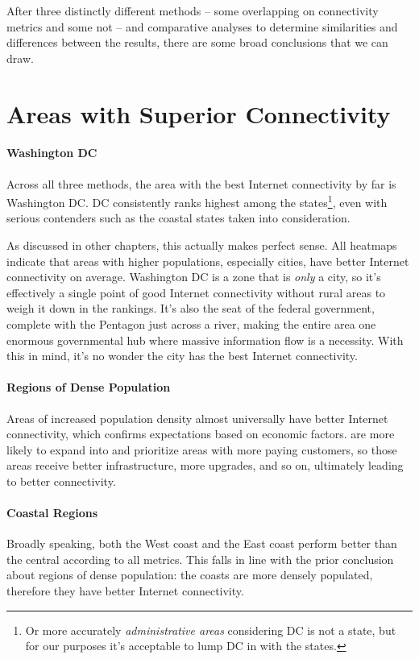 After three distinctly different methods -- some overlapping on connectivity metrics and some not -- and comparative analyses to determine similarities and differences between the results, there are some broad conclusions that we can draw.

\section{Areas with Superior Connectivity}

\paragraph{Washington DC} Across all three methods, the area with the best Internet connectivity by far is Washington DC. DC consistently ranks highest among the states\footnote{Or more accurately \textit{administrative areas} considering DC is not a state, but for our purposes it's acceptable to lump DC in with the states.}, even with serious contenders such as the coastal states taken into consideration.

As discussed in other chapters, this actually makes perfect sense. All heatmaps indicate that areas with higher populations, especially cities, have better Internet connectivity on average. Washington DC is a zone that is \textit{only} a city, so it's effectively a single point of good Internet connectivity without rural areas to weigh it down in the rankings. It's also the seat of the \us federal government, complete with the Pentagon just across a river, making the entire area one enormous governmental hub where massive information flow is a necessity. With this in mind, it's no wonder the city has the best Internet connectivity.

\paragraph{Regions of Dense Population} Areas of increased population density almost universally have better Internet connectivity, which confirms expectations based on economic factors. \ISPs are more likely to expand into and prioritize areas with more paying customers, so those areas receive better infrastructure, more upgrades, and so on, ultimately leading to better connectivity.

\paragraph{Coastal Regions} Broadly speaking, both the West coast and the East coast perform better than the central \us according to all metrics. This falls in line with the prior conclusion about regions of dense population: the coasts are more densely populated, therefore they have better Internet connectivity.

